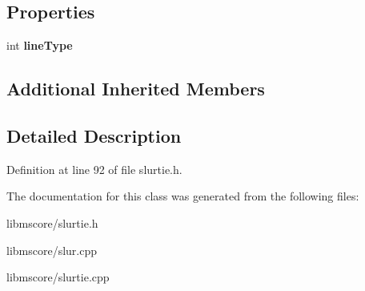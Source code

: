 \subsection*{Properties}
\begin{DoxyCompactItemize}
\item 
\mbox{\label{class_ms_1_1_slur_tie_a70632f46725054c4df8d357f0a236d93}} 
int {\bfseries line\+Type}
\end{DoxyCompactItemize}
\subsection*{Additional Inherited Members}


\subsection{Detailed Description}


Definition at line 92 of file slurtie.\+h.



The documentation for this class was generated from the following files\+:\begin{DoxyCompactItemize}
\item 
libmscore/slurtie.\+h\item 
libmscore/slur.\+cpp\item 
libmscore/slurtie.\+cpp\end{DoxyCompactItemize}
